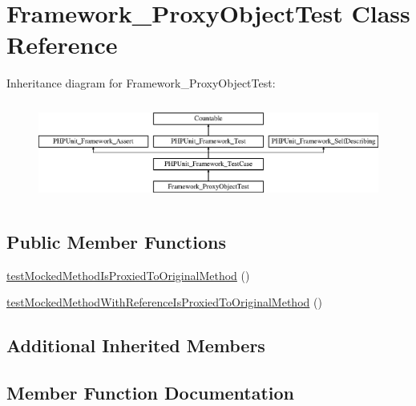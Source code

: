 \hypertarget{class_framework___proxy_object_test}{}\section{Framework\+\_\+\+Proxy\+Object\+Test Class Reference}
\label{class_framework___proxy_object_test}
Inheritance diagram for Framework\+\_\+\+Proxy\+Object\+Test\+:\begin{figure}[H]
\begin{center}
\leavevmode
\includegraphics[height=3.303835cm]{class_framework___proxy_object_test}
\end{center}
\end{figure}
\subsection*{Public Member Functions}
\begin{DoxyCompactItemize}
\item 
\mbox{\hyperlink{class_framework___proxy_object_test_a18a58b5664588cc8e44ce8899aa9ae3b}{test\+Mocked\+Method\+Is\+Proxied\+To\+Original\+Method}} ()
\item 
\mbox{\hyperlink{class_framework___proxy_object_test_a4982c8994953fdf9847effd93a5b5d72}{test\+Mocked\+Method\+With\+Reference\+Is\+Proxied\+To\+Original\+Method}} ()
\end{DoxyCompactItemize}
\subsection*{Additional Inherited Members}


\subsection{Member Function Documentation}
\mbox{\label{class_framework___proxy_object_test_a18a58b5664588cc8e44ce8899aa9ae3b}} 
